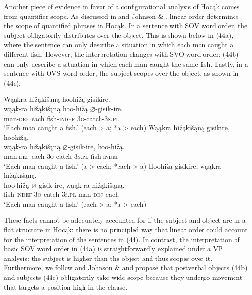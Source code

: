 \documentclass[output=paper]{LSP/langsci}
\begin{document}
Another piece of evidence in favor of a configurational analysis of Hocąk comes from quantifier scope. As discussed in \citealt{Johnson2014} and Johnson \& \citealt{Rosen2014}, linear order determines the scope of quantified phrases in Hocąk. In a sentence with SOV word order, the subject obligatorily distributes over the object. This is shown below in (44a), where the sentence can only describe a situation in which each man caught a different fish. However, the interpretation changes with SVO word order: (44b) can only describe a situation in which each man caught the same fish. Lastly, in a sentence with OVS word order, the subject scopes over the object, as shown in (44c).

\begin{exe}
\ex
\begin{xlist}
\ex 
\glll Wąąkra	hi\v{z}ąki\v{s}ąną		hoohi\v{z}ą	gisikire.\\
wąąk-ra		hi\v{z}ąki\v{s}ąną		hoo-hi\v{z}ą	$\varnothing$-gisik-ire. \\
		man-\textsc{def}		each					fish-\textsc{indef}		\textsc{3o}-catch-\textsc{3s.pl} \\
\trans `Each man caught a fish.' (each > a; *a > each)
\ex 
\glll Wąąkra		hi\v{z}ąki\v{s}ąną		gisikire,			hoohi\v{z}ą.\\
wąąk-ra		hi\v{z}ąki\v{s}ąną		$\varnothing$-gisik-ire,	hoo-hi\v{z}ą. \\
		man-\textsc{def}		each					\textsc{3o}-catch-\textsc{3s.pl}		fish-\textsc{indef} \\
\trans `Each man caught a fish.'  (a > each; *each > a)
\ex 
\glll Hoohi\v{z}ą	gisikire,	wąąkra	 hi\v{z}ąki\v{s}ąną.\\
hoo-hi\v{z}ą	$\varnothing$-gisik-ire,		wąąk-ra	hi\v{z}ąki\v{s}ąną. \\
		fish-\textsc{indef}		\textsc{3o}-catch-\textsc{3s.pl}		man-\textsc{def}		each \\
\trans `Each man caught a fish.' (each > a; *a > each)
\end{xlist}
\end{exe}

These facts cannot be adequately accounted for if the subject and object are in a flat structure in Hocąk: there is no principled way that linear order could account for the interpretation of the sentences in (44). In contrast, the interpretation of basic SOV word order in (44a) is straightforwardly explained under a VP analysis: the subject is higher than the object and thus scopes over it. Furthermore, we follow \citet{Johnson2014} and Johnson \& \citet{Rosen2014} and propose that postverbal objects (44b) and subjects (44c) obligatorily take wide scope because they undergo movement that targets a position high in the clause. 
\end{document}
